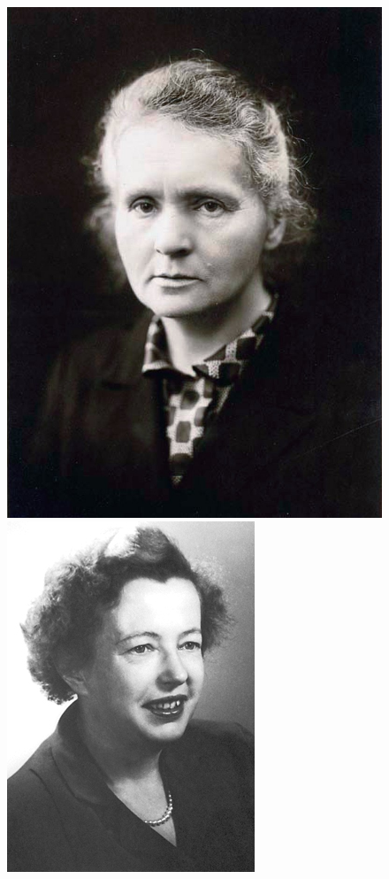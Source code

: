 \documentclass[11pt, brazil]{beamer}
\begin{document}
\begin{frame}
\begin{figure}
 \includegraphics[scale=0.06]{figuras/curie.jpg}
 \includegraphics[scale=0.17]{figuras/mayer.jpg}

\end{figure}
\end{frame}
\end{document}
